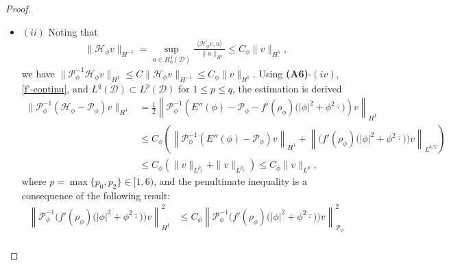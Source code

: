 \documentclass[preprint,3p]{elsarticle}
\begin{document}
\begin{proof}
\begin{itemize}[label={},left=0pt]
		Moreover, if $v \in N_\phi \mathcal{M}$ (resp. $v \in T_\phi \mathcal{M}$), then $I_{-\alpha}^{-\beta} v \in N_{\phi_g} \mathcal{M}$ (resp. $I_{-\alpha}^{-\beta} v \in T_{\phi_g} \mathcal{M}$). Therefore, the same lower and upper bounds carry over to all $\phi \in \mathcal{S}$, yielding
			\begin{align*}
				0 < \inf_{v \in N_{\phi}\mathcal{M} \setminus \{0\}} 
				\frac{\big\langle (E''(\phi) - \lambda_g \mathcal{I}) v, v \big\rangle}{\langle \mathcal{P}_{\phi} v, v \rangle}
				= \mu
				\le
				L = \sup_{v \in T_{\phi}\mathcal{M} \setminus \{0\}} 
				\frac{\big\langle (E''(\phi) - \lambda_g \mathcal{I}) v, v \big\rangle}{\langle \mathcal{P}_{\phi} v, v \rangle}
				< \infty.
		\end{align*}
		\item $(ii)$ Noting that
		\begin{align*}
			\big\|\mathcal{H}_{\phi}v\big\|_{H^{-1}}=\sup\limits_{u\in H_0^1(\mathcal{D})}\frac{\big\langle \mathcal{H}_{\phi}v,u\big\rangle}{\quad\|u\|_{H^1}}\le C_{\phi}\|v\|_{H^1},
		\end{align*}
		we have $\big\|\mathcal{P}_{\phi}^{-1}\mathcal{H}_{\phi}v\big\|_{H^1}\le C	\big\|\mathcal{H}_{\phi}v\big\|_ {H^{-1}}\le C_{\phi}\|v\|_{H^1}$. Using {\bf (A6)}-$(iv)$, \eqref{f'-continu}, and $L^q(\mathcal{D})\subset L^p(\mathcal{D})$ for $ 1\le p\le q$, the estimation is derived
		\begin{align*}
			\big\|\mathcal{P}_{\phi}^{-1}(\mathcal{H}_{\phi}-\mathcal{P}_{\phi})v\big\|_{H^1}&= \frac{1}{2}\left\|\mathcal{P}_{\phi}^{-1}\left(E''(\phi)- \mathcal{P}_{\phi}-f'(\rho_{\phi})\big(|\phi|^2+\phi^2\overline{\cdot}\big)\right)v\right\|_{H^1}\\
			&\le C_{\phi}\left(\left\|\mathcal{P}_{\phi}^{-1}\left(E''(\phi)- \mathcal{P}_{\phi}\right)v\right\|_{H^1}+\left\|\big(f'(\rho_{\phi})\big(|\phi|^2+\phi^2\overline{\cdot}\big)\big)v\right\|_{L^{6/5}}\right) \\
			&\le C_{\phi}\left(\|v\|_{L^{p_2}}+\|v\|_{L^{p_0}}\right)\le C_{\phi}\|v\|_{L^{p}},
		\end{align*}
		where $p=\max\{p_0,p_2\}\in[1,6)$, and the penultimate inequality is a consequence of the following result:
		\begin{align*}
			\left\|\mathcal{P}_{\phi}^{-1}\big(f'(\rho_{\phi})\big(|\phi|^2+\phi^2\overline{\cdot}\big)\big)v\right\|^2_{H^1}&\le C_{\phi}\left\|\mathcal{P}_{\phi}^{-1}\big(f'(\rho_{\phi})\big(|\phi|^2+\phi^2\overline{\cdot}\big)\big)v\right\|^2_{\mathcal{P}_{\phi}}\\

\end{align*}
\end{itemize}
\end{proof}
\end{document}
